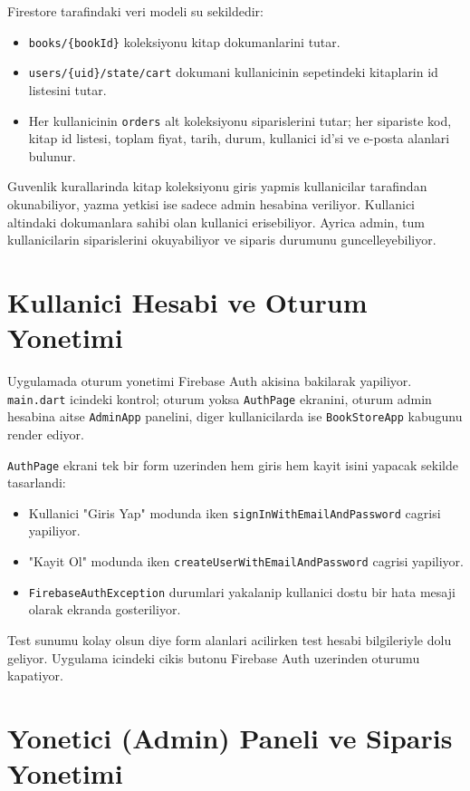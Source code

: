 \documentclass[12pt,a4paper]{article}
\begin{document}
Firestore tarafindaki veri modeli su sekildedir:

\begin{itemize}
  \item \verb|books/{bookId}| koleksiyonu kitap dokumanlarini tutar.
  \item \verb|users/{uid}/state/cart| dokumani kullanicinin sepetindeki kitaplarin id listesini tutar.
  \item Her kullanicinin \verb|orders| alt koleksiyonu siparislerini tutar; her sipariste kod, kitap id listesi, toplam fiyat, tarih, durum, kullanici id'si ve e-posta alanlari bulunur.
\end{itemize}

Guvenlik kurallarinda kitap koleksiyonu giris yapmis kullanicilar tarafindan okunabiliyor, yazma yetkisi ise sadece admin hesabina veriliyor. Kullanici altindaki dokumanlara sahibi olan kullanici erisebiliyor. Ayrica admin, tum kullanicilarin siparislerini okuyabiliyor ve siparis durumunu guncelleyebiliyor.

\section{Kullanici Hesabi ve Oturum Yonetimi}

Uygulamada oturum yonetimi Firebase Auth akisina bakilarak yapiliyor. \verb|main.dart| icindeki kontrol; oturum yoksa \verb|AuthPage| ekranini, oturum admin hesabina aitse \verb|AdminApp| panelini, diger kullanicilarda ise \verb|BookStoreApp| kabugunu render ediyor.

\verb|AuthPage| ekrani tek bir form uzerinden hem giris hem kayit isini yapacak sekilde tasarlandi:

\begin{itemize}
  \item Kullanici "Giris Yap" modunda iken \verb|signInWithEmailAndPassword| cagrisi yapiliyor.
  \item "Kayit Ol" modunda iken \verb|createUserWithEmailAndPassword| cagrisi yapiliyor.
  \item \verb|FirebaseAuthException| durumlari yakalanip kullanici dostu bir hata mesaji olarak ekranda gosteriliyor.
\end{itemize}

Test sunumu kolay olsun diye form alanlari acilirken test hesabi bilgileriyle dolu geliyor. Uygulama icindeki cikis butonu Firebase Auth uzerinden oturumu kapatiyor.

\section{Yonetici (Admin) Paneli ve Siparis Yonetimi}
\end{document}
